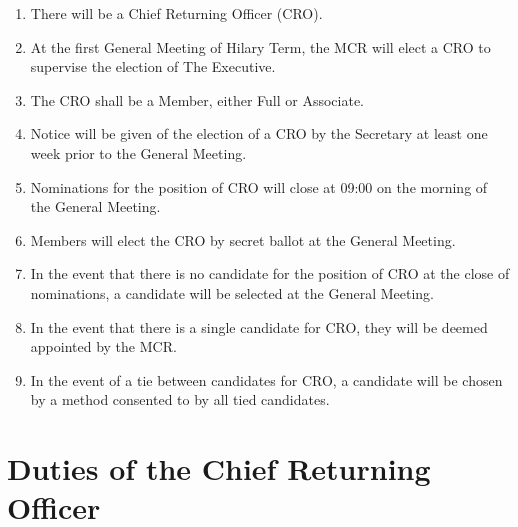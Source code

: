 \documentclass[11pt, a4paper]{article}
\begin{document}
\begin{enumerate}
	\item There will be a Chief Returning Officer (CRO).
    \item At the first General Meeting of Hilary Term, the MCR will elect a CRO to supervise the election of The Executive.
    \item The CRO shall be a Member, either Full or Associate.
    \item Notice will be given of the election of a CRO by the Secretary at least one week prior to the General Meeting.
    \item Nominations for the position of CRO will close at 09:00 on the morning of the General Meeting.
    \item Members will elect the CRO by secret ballot at the General Meeting.
    \item In the event that there is no candidate for the position of CRO at the close of nominations, a candidate will be selected at the General Meeting.
    \item In the event that there is a single candidate for CRO, they will be deemed appointed by the MCR.
    \item In the event of a tie between candidates for CRO, a candidate will be chosen by a method consented to by all tied candidates.
\end{enumerate}





\section{Duties of the Chief Returning Officer}
\label{sec:cro_duties}
\end{document}
